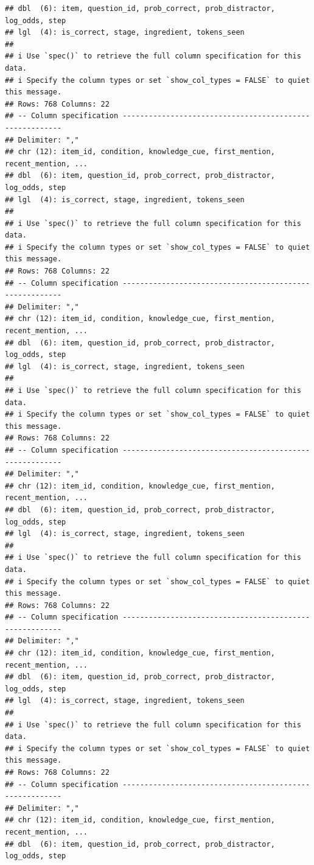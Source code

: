 \documentclass[
]{article}
\begin{document}
\begin{verbatim}
## dbl  (6): item, question_id, prob_correct, prob_distractor, log_odds, step
## lgl  (4): is_correct, stage, ingredient, tokens_seen
## 
## i Use `spec()` to retrieve the full column specification for this data.
## i Specify the column types or set `show_col_types = FALSE` to quiet this message.
## Rows: 768 Columns: 22
## -- Column specification --------------------------------------------------------
## Delimiter: ","
## chr (12): item_id, condition, knowledge_cue, first_mention, recent_mention, ...
## dbl  (6): item, question_id, prob_correct, prob_distractor, log_odds, step
## lgl  (4): is_correct, stage, ingredient, tokens_seen
## 
## i Use `spec()` to retrieve the full column specification for this data.
## i Specify the column types or set `show_col_types = FALSE` to quiet this message.
## Rows: 768 Columns: 22
## -- Column specification --------------------------------------------------------
## Delimiter: ","
## chr (12): item_id, condition, knowledge_cue, first_mention, recent_mention, ...
## dbl  (6): item, question_id, prob_correct, prob_distractor, log_odds, step
## lgl  (4): is_correct, stage, ingredient, tokens_seen
## 
## i Use `spec()` to retrieve the full column specification for this data.
## i Specify the column types or set `show_col_types = FALSE` to quiet this message.
## Rows: 768 Columns: 22
## -- Column specification --------------------------------------------------------
## Delimiter: ","
## chr (12): item_id, condition, knowledge_cue, first_mention, recent_mention, ...
## dbl  (6): item, question_id, prob_correct, prob_distractor, log_odds, step
## lgl  (4): is_correct, stage, ingredient, tokens_seen
## 
## i Use `spec()` to retrieve the full column specification for this data.
## i Specify the column types or set `show_col_types = FALSE` to quiet this message.
## Rows: 768 Columns: 22
## -- Column specification --------------------------------------------------------
## Delimiter: ","
## chr (12): item_id, condition, knowledge_cue, first_mention, recent_mention, ...
## dbl  (6): item, question_id, prob_correct, prob_distractor, log_odds, step
## lgl  (4): is_correct, stage, ingredient, tokens_seen
## 
## i Use `spec()` to retrieve the full column specification for this data.
## i Specify the column types or set `show_col_types = FALSE` to quiet this message.
## Rows: 768 Columns: 22
## -- Column specification --------------------------------------------------------
## Delimiter: ","
## chr (12): item_id, condition, knowledge_cue, first_mention, recent_mention, ...
## dbl  (6): item, question_id, prob_correct, prob_distractor, log_odds, step

\end{verbatim}
\end{document}
